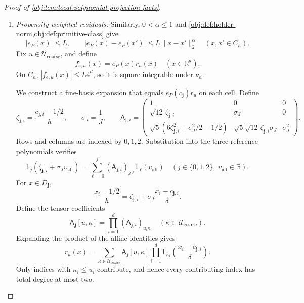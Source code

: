 \documentclass[11pt]{article}
\begin{document}
\begin{proof}[Proof of \cref{obj:lem:local-polynomial-projection-facts}]
\begin{enumerate}
\item \emph{Propensity-weighted residuals.}
Similarly, \(0<\alpha\le1\) and
\cref{obj:def:holder-norm,obj:def:primitive-class} give
\[
|e_P(x)|\le L,
\qquad
|e_P(x)-e_P(x')|\le L\|x-x'\|_2^\alpha
\quad(x,x'\in C_h).
\]
Fix \(u\in\mathcal U_{\mathrm{coarse}}\), and define
\[
f_{e,u}(x)=e_P(x)r_u(x)
\quad(x\in\mathbb R^d).
\]
On \(C_h\), \(|f_{e,u}(x)|\le L4^d\), so it is square integrable
under \(\nu_h\).

We construct a fine-basis expansion that equals
\(e_P(c_{\mathbf j})r_u\) on each cell. Define
\[
\zeta_{\mathbf j,i}=\frac{c_{\mathbf j,i}-1/2}{h},
\qquad
\sigma_J=\frac1J,
\qquad
\mathsf A_{\mathbf j,i}=
\begin{pmatrix}
1&0&0\\
\sqrt{12}\,\zeta_{\mathbf j,i}&\sigma_J&0\\
\sqrt5(6\zeta_{\mathbf j,i}^2+\sigma_J^2/2-1/2)
 &\sqrt5\sqrt{12}\,\zeta_{\mathbf j,i}\sigma_J&\sigma_J^2
\end{pmatrix}.
\]
Rows and columns are indexed by \(0,1,2\). Substitution into the three
reference polynomials verifies
\[
\mathsf L_j(\zeta_{\mathbf j,i}+\sigma_J\upsilon_{\mathrm{aff}})
 =
 \sum_{\ell=0}^j
 (\mathsf A_{\mathbf j,i})_{j\ell}
 \mathsf L_\ell(\upsilon_{\mathrm{aff}})
\quad(j\in\{0,1,2\},\ \upsilon_{\mathrm{aff}}\in\mathbb R).
\]
For \(x\in D_{\mathbf j}\),
\[
\frac{x_i-1/2}{h}
 =\zeta_{\mathbf j,i}
   +\sigma_J\frac{x_i-c_{\mathbf j,i}}{\delta}.
\]
Define the tensor coefficients
\[
\mathsf A_{\mathbf j}[u,\kappa]
 =\prod_{i=1}^d(\mathsf A_{\mathbf j,i})_{u_i\kappa_i}
 \quad(\kappa\in\mathcal U_{\mathrm{coarse}}).
\]
Expanding the product of the affine identities gives
\[
r_u(x)=
 \sum_{\kappa\in\mathcal U_{\mathrm{coarse}}}
 \mathsf A_{\mathbf j}[u,\kappa]
 \prod_{i=1}^d
 \mathsf L_{\kappa_i}\!\left(\frac{x_i-c_{\mathbf j,i}}{\delta}\right).
\]
Only indices with \(\kappa_i\le u_i\) contribute, and hence every
contributing index has total degree at most two.


\end{enumerate}
\end{proof}
\end{document}
